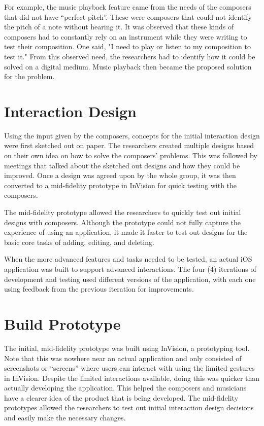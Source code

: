           	For example, the music playback feature came from the needs of the composers that did not have ``perfect pitch''. These were composers that could not identify the pitch of a note without hearing it. It was observed that these kinds of composers had to constantly rely on an instrument while they were writing to test their composition. One said, "I need to play or listen to my composition to test it." From this observed need, the researchers had to identify how it could be solved on a digital medium. Music playback then became the proposed solution for the problem. 

	\section{Interaction Design}

		Using the input given by the composers, concepts for the initial interaction design were first sketched out on paper. The researchers created multiple designs based on their own idea on how to solve the composers' problems. This was followed by meetings that talked about the sketched out designs and how they could be improved. Once a design was agreed upon by the whole group, it was then converted to a mid-fidelity prototype in InVision for quick testing with the composers. 

		The mid-fidelity prototype allowed the researchers to quickly test out initial designs with composers. Although the prototype could not fully capture the experience of using an application, it made it faster to test out designs for the basic core tasks of adding, editing, and deleting. 

		When the more advanced features and tasks needed to be tested, an actual iOS application was built to support advanced interactions. The four (4) iterations of development and testing used different versions of the application, with each one using feedback from the previous iteration for improvements. 

	\section{Build Prototype}

		The initial, mid-fidelity prototype was built using InVision, a prototyping tool. Note that this was nowhere near an actual application and only consisted of screenshots or ``screens'' where users can interact with using the limited gestures in InVision. Despite the limited interactions available, doing this was quicker than actually developing the application. This helped the composers and musicians have a clearer idea of the product that is being developed. The mid-fidelity prototypes allowed the researchers to test out initial interaction design decisions and easily make the necessary changes. 

